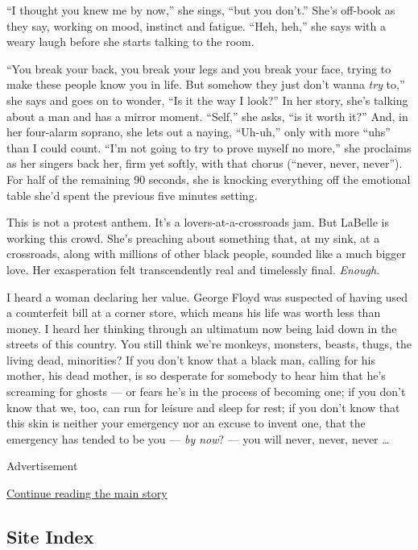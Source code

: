 ``I thought you knew me by now,'' she sings, ``but you don't.'' She's
off-book as they say, working on mood, instinct and fatigue. ``Heh,
heh,'' she says with a weary laugh before she starts talking to the
room.

``You break your back, you break your legs and you break your face,
trying to make these people know you in life. But somehow they just
don't wanna \emph{try} to,'' she says and goes on to wonder, ``Is it the
way I look?'' In her story, she's talking about a man and has a mirror
moment. ``Self,'' she asks, ``is it worth it?'' And, in her four-alarm
soprano, she lets out a naying, ``Uh-uh,'' only with more ``uhs'' than I
could count. ``I'm not going to try to prove myself no more,'' she
proclaims as her singers back her, firm yet softly, with that chorus
(``never, never, never''). For half of the remaining 90 seconds, she is
knocking everything off the emotional table she'd spent the previous
five minutes setting.

This is not a protest anthem. It's a lovers-at-a-crossroads jam. But
LaBelle is working this crowd. She's preaching about something that, at
my sink, at a crossroads, along with millions of other black people,
sounded like a much bigger love. Her exasperation felt transcendently
real and timelessly final. \emph{Enough.}

I heard a woman declaring her value. George Floyd was suspected of
having used a counterfeit bill at a corner store, which means his life
was worth less than money. I heard her thinking through an ultimatum now
being laid down in the streets of this country. You still think we're
monkeys, monsters, beasts, thugs, the living dead, minorities? If you
don't know that a black man, calling for his mother, his dead mother, is
so desperate for somebody to hear him that he's screaming for ghosts ---
or fears he's in the process of becoming one; if you don't know that we,
too, can run for leisure and sleep for rest; if you don't know that this
skin is neither your emergency nor an excuse to invent one, that the
emergency has tended to be you --- \emph{by now}? --- you will never,
never, never \ldots{}

Advertisement

\protect\hyperlink{after-bottom}{Continue reading the main story}

\hypertarget{site-index}{%
\subsection{Site Index}\label{site-index}}


